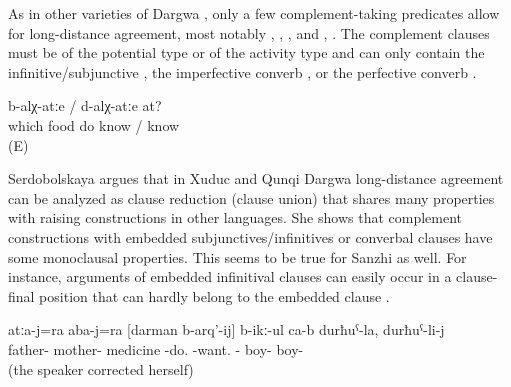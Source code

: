 As in other varieties of Dargwa \citep{Serdobolskaya2010}, only a few complement-taking predicates allow for long-distance agreement, most notably  ,  ,  , and  , . The complement clauses must be of the potential type or of the activity type and can only contain the infinitive\slash subjunctive , the imperfective converb , or the perfective converb . 
%
\begin{exe}
	\ex	\label{ex:‎Which food do you know to cook}
		b-alχ-atːe	/	d-alχ-atːe	at?\\
		which	food	do	know	/	know	\\
	\glt	{} (E)
\end{exe}

Serdobolskaya \citeyearpar{Serdobolskaya2009, Serdobolskaya2010} argues that in Xuduc and Qunqi Dargwa long-distance agreement can be analyzed as clause reduction (clause union) that shares many properties with raising constructions in other languages. She shows that complement constructions with embedded subjunctives/infinitives or converbal clauses have some monoclausal properties. This seems to be true for Sanzhi as well. For instance, arguments of embedded infinitival clauses can easily occur in a clause-final position that can hardly belong to the embedded clause .

\begin{exe}
	\ex	\label{ex:The father and the mother want to give medicine of the son, to the son.}
	\gll	atːa-j=ra	aba-j=ra	[darman	b-arq'-ij]	b-ikː-ul	ca-b	durħuˁ-la,		durħuˁ-li-j\\
		father-	mother-	medicine	\tsc{n}-do.	-want.	-	boy-	boy-\\
	\glt	{} (the speaker corrected herself)
\end{exe}

